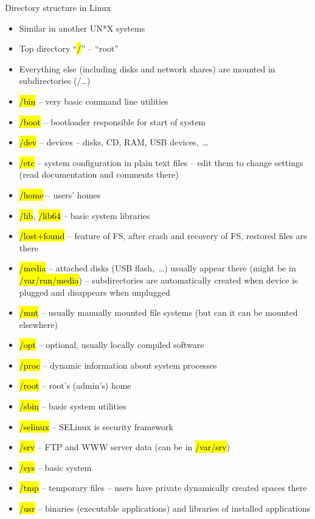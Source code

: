 \documentclass[compress, ucs, xelatex, 11pt, xcolor=svgnames,
  hyperref={
    bookmarks=true,
    unicode=true,
    colorlinks=true,
    pdftitle={Linux, command line and MetaCentrum},
    plainpages=false,
    pdfauthor={Vojtech Zeisek},
    pdfsubject={Course about use of Linux command line, writing shell scripts and using MetaCentrum of CESNET},
    pdfcreator={XeLaTeX},
    pdfkeywords={Linux, GNU, BASH, shell, command line, MetaCentrum},
    linkcolor=DarkRed,
    anchorcolor=DarkBlue,
    citecolor=Indigo,
    filecolor=NavyBlue,
    menucolor=DarkMagenta,
    urlcolor=DarkBlue,
    pdftex},
  url={hyphens, lowtilde} %
  ]{beamer}
\renewcommand{\texttt}[1]{\hl{\ttfamily #1}}
\renewcommand{\alert}[1]{\textcolor{red}{#1}}
\begin{document}
\begin{frame}[allowframebreaks]{Directory structure in Linux}
\begin{itemize}
  \item Similar in another UN*X systems
  \item Top directory ``\texttt{/}'' -- ``root''
  \item Everything else (including disks and network shares) are mounted in subdirectories (/\ldots)
  \item \texttt{/bin} -- very basic command line utilities
  \item \texttt{/boot} -- bootloader responsible for start of system
  \item \texttt{/dev} -- devices -- disks, CD, RAM, USB devices,~\ldots
  \item \alert{\texttt{/etc}} -- system configuration in plain text files -- edit them to change settings (read documentation and comments there)
  \item \alert{\texttt{/home}} -- users' homes
  \item \texttt{/lib}, \texttt{/lib64} -- basic system libraries
  \item \texttt{/lost+found} -- feature of FS, after crash and recovery of FS, restored files are there
  \item \alert{\texttt{/media}} -- attached disks (USB flash,~\ldots) usually appear there (might be in \texttt{/var/run/media}) -- subdirectories are automatically created when device is plugged and disappears when unplugged
  \item \texttt{/mnt} -- usually manually mounted file systems (but can it can be mounted elsewhere)
  \item \texttt{/opt} -- optional, usually locally compiled software
  \item \texttt{/proc} -- dynamic information about system processes
  \item \texttt{/root} -- root's (admin's) home
  \item \texttt{/sbin} -- basic system utilities
  \item \texttt{/selinux} -- SELinux is security framework
  \item \texttt{/srv} -- FTP and WWW server data (can be in \texttt{/var/srv})
  \item \texttt{/sys} -- basic system
  \item \texttt{/tmp} -- temporary files -- users have private dynamically created spaces there
  \item \texttt{/usr} -- binaries (executable applications) and libraries of installed applications

\end{itemize}
\end{frame}
\end{document}
